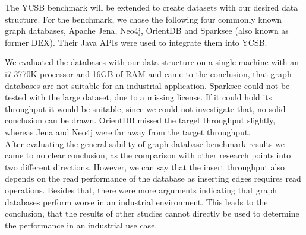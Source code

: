 The YCSB benchmark will be extended to create datasets with our desired data structure.
For the benchmark,
we chose the following four commonly known graph databases, Apache Jena, Neo4j, OrientDB and Sparksee (also known as former DEX).
Their Java APIs were used to integrate them into YCSB.

We evaluated the databases with our data structure on a single machine with an i7-3770K processor and 16GB of RAM and came to the conclusion,
that graph databases are not suitable for an industrial application.
Sparksee could not be tested with the large dataset,
due to a missing license.
If it could hold its throughput it would be suitable,
since we could not investigate that,
no solid conclusion can be drawn.
OrientDB missed the target throughput slightly,
whereas Jena and Neo4j were far away from the target throughput.\\
After evaluating the generalisability of graph database benchmark results we came to no clear conclusion,
as the comparison with other research points into two different directions.
However,
we can say that the insert throughput also depends on the read performance of the database as inserting edges requires read operations.
Besides that,
there were more arguments indicating that graph databases perform worse in an industrial environment.
This leads to the conclusion,
that the results of other studies cannot directly be used to determine the performance in an industrial use case.

\cleardoublepage
